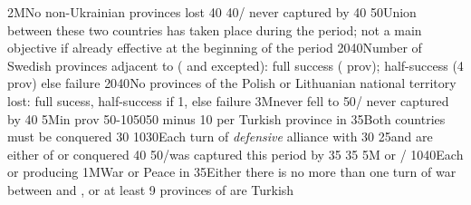 %
\EUobjective2M{No non-Ukrainian provinces lost}{}%
{}{40}{}%
%
%
{}{40}{\provinceOsterreich/ never captured by
  }%
%
%
{}{40}{}%
%
%
%
{}{50}{Union between these two countries has taken place during the period;
  not a main objective if already effective at the beginning of the period}%
%
%
%
{20}{40}{Number of Swedish provinces adjacent to \regionBaltique (\regionSuede
  and \regionFinlande excepted): full success ( prov);
  half-success (4 prov) else failure}%
%
%
{20}{40}{No provinces of the Polish or Lithuanian national territory lost:
  full sucess, half-success if 1, else failure}%
%
\EUobjective3M{\villeVienne never fell to \TUR}{}%
{}{50}{\provinceOsterreich/ never captured by
  }%
%
%
{}{40}{}%
%
\EUobjective5M{\TUR in \payshongrie}{prov}%
{50-10}{50}{50 \VPs minus 10 \VPs per Turkish province in \payshongrie}%
%
 
%
%
{}{35}{Both countries must be conquered}%
%
%
{}{30}{}%
%
%
{10}{30}{Each turn of \emph{defensive} alliance with \paysmajeurFrance}%
%
%
{}{30}{}%
%
%
{}{25}{\paysvalachie and \paysmoldavie are either \VASSAL of \TUR or
  conquered}%
%
%
%
{}{40}{}%
%
%
{}{50}{\provinceOsterreich/\villeVienne was captured this period by \TUR}%
%
%
{}{35}{}%
%
%
{}{35}{}%
%
\EUobjective5M{ or }{\COL/\TP}%
{10}{40}{Each \COL or \TP producing \POSPICE}%
%
%
\EUobjective1M{War or Peace in \payshongrie}{}%
{}{35}{Either there is no more than one turn of war between \AUSaus and \TUR,
  or at least 9 provinces of \payshongrie are Turkish}%
%
%
